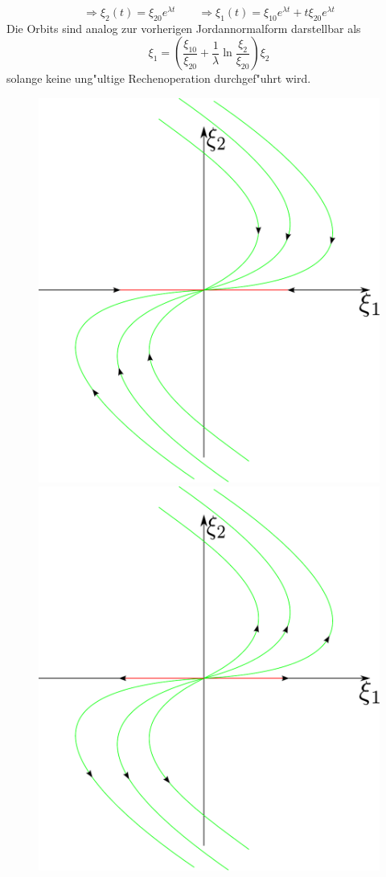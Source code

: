 \documentclass[a4paper, 13pt]{scrreprt}
\theoremstyle{definition} \newtheorem{definition}{Definition}[section]
\begin{document}
				$$
				\Rightarrow \xi_2(t) = \xi_{20} e ^{\lambda t} \qquad \Rightarrow \xi_1(t) = \xi_{10} e ^{\lambda t} + t \xi_{20} e ^{\lambda t}$$
				Die Orbits sind analog zur vorherigen Jordannormalform darstellbar als
				$$ \xi_1 = \left( \frac{\xi_{10}}{\xi_{20}} + \frac{1}{\lambda} \ln{\frac{\xi_2}{\xi_{20}}}\right) \xi_2$$
solange keine ung"ultige Rechenoperation durchgef"uhrt wird. 
	\begin{figure}[htpb]
		\centering
		\includegraphics[height=0.31\textheight]{img/lin_sys/lin_sys_6.pdf}
		\includegraphics[height=0.31\textheight]{img/lin_sys/lin_sys_6_2.pdf}

\end{figure}
\end{document}
